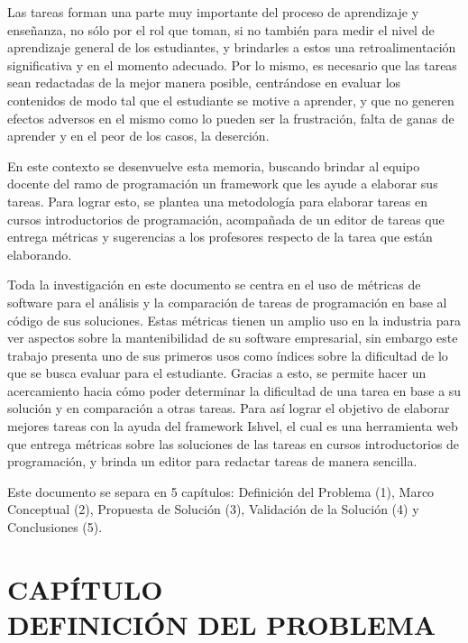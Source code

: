 \documentclass[letterpaper,12pt]{article}
\newcommand{\secnumbersection}[1]{
\addtocounter{section}{1}
\section*{CAPÍTULO \thesection \texorpdfstring{\\}\ #1}
\addcontentsline{toc}{section}{CAPÍTULO \thesection : #1}
\setcounter{subsection}{0}
}
\begin{document}
Las tareas forman una parte muy importante del proceso de aprendizaje y enseñanza, no sólo por el rol que toman, si no también para medir el nivel de aprendizaje general de los estudiantes, y brindarles a estos una retroalimentación significativa y en el momento adecuado. Por lo mismo, es necesario que las tareas sean redactadas de la mejor manera posible, centrándose en evaluar los contenidos de modo tal que el estudiante se motive a aprender, y que no generen efectos adversos en el mismo como lo pueden ser la frustración, falta de ganas de aprender y en el peor de los casos, la deserción.

En este contexto se desenvuelve esta memoria, buscando brindar al equipo docente del ramo de programación un framework que les ayude a elaborar sus tareas. Para lograr esto, se plantea una metodología para elaborar tareas en cursos introductorios de programación, acompañada de un editor de tareas que entrega métricas y sugerencias a los profesores respecto de la tarea que están elaborando.

Toda la investigación en este documento se centra en el uso de métricas de software para el análisis y la comparación de tareas de programación en base al código de sus soluciones. Estas métricas tienen un amplio uso en la industria para ver aspectos sobre la mantenibilidad de su software empresarial, sin embargo este trabajo presenta uno de sus primeros usos como índices sobre la dificultad de lo que se busca evaluar para el estudiante. Gracias a esto, se permite hacer un acercamiento hacia cómo poder determinar la dificultad de una tarea en base a su solución y en comparación a otras tareas. Para así lograr el objetivo de elaborar mejores tareas con la ayuda del framework Ishvel, el cual es una herramienta web que entrega métricas sobre las soluciones de las tareas en cursos introductorios de programación, y brinda un editor para redactar tareas de manera sencilla.

Este documento se separa en 5 capítulos: Definición del Problema (1), Marco Conceptual (2), Propuesta de Solución (3), Validación de la Solución (4) y Conclusiones (5).

\newpage

\secnumbersection{DEFINICIÓN DEL PROBLEMA} \label{sec:problema}
\end{document}

